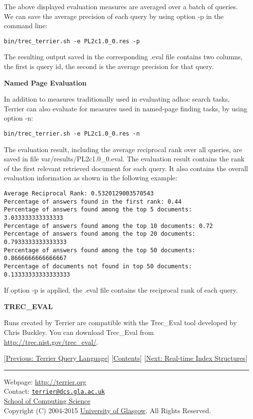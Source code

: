 The above displayed evaluation measures are averaged over a batch of
queries. We can save the average precision of each query by using option
-p in the command line:

\begin{verbatim}
bin/trec_terrier.sh -e PL2c1.0_0.res -p
\end{verbatim}

The resulting output saved in the corresponding .eval file contains two
columns, the first is query id, the second is the average precision for
that query.

\textbf{Named Page Evaluation}

In addition to measures traditionally used in evaluating adhoc search
tasks, Terrier can also evaluate for measures used in named-page finding
tasks, by using option -n:

\begin{verbatim}
bin/trec_terrier.sh -e PL2c1.0_0.res -n
\end{verbatim}

The evaluation result, including the average reciprocal rank over all
queries, are saved in file var/results/PL2c1.0\_0.eval. The evaluation
result contains the rank of the first relevant retrieved document for
each query. It also contains the overall evaluation information as shown
in the following example:

\begin{verbatim}
Average Reciprocal Rank: 0.5320129003570543
Percentage of answers found in the first rank: 0.44
Percentage of answers found among the top 5 documents: 3.033333333333333
Percentage of answers found among the top 10 documents: 0.72
Percentage of answers found among the top 20 documents: 0.7933333333333333
Percentage of answers found among the top 50 documents: 0.8666666666666667
Percentage of documents not found in top 50 documents: 0.13333333333333333
\end{verbatim}

If option -p is applied, the .eval file contains the reciprocal rank of
each query.

\textbf{TREC\_EVAL}

Runs created by Terrier are compatible with the Trec\_Eval tool
developed by Chris Buckley. You can download Trec\_Eval from
\url{http://trec.nist.gov/trec_eval/}.

{[}\href{querylanguage.html}{Previous: Terrier Query Language}{]}
{[}\href{index.html}{Contents}{]} {[}\href{realtime_indices.html}{Next:
Real-time Index Structures}{]}

\begin{center}\rule{0.5\linewidth}{\linethickness}\end{center}

Webpage: \url{http://terrier.org}\\
Contact:
\href{mailto:terrier@dcs.gla.ac.uk}{\nolinkurl{terrier@dcs.gla.ac.uk}}\\
\href{http://www.dcs.gla.ac.uk/}{School of Computing Science}\\
Copyright (C) 2004-2015 \href{http://www.gla.ac.uk/}{University of
Glasgow}. All Rights Reserved.
